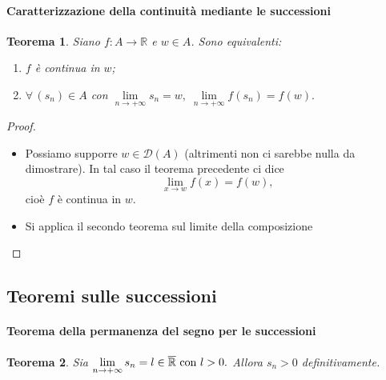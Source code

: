 \documentclass{article}
\theoremstyle{plain}
\newtheorem{thm}{Teorema}[section]
\theoremstyle{definition}
\theoremstyle{remark}
\begin{document}
\vspace{10pt}

\paragraph{Caratterizzazione della continuità mediante le successioni}
\begin{bxthm}
\begin{thm}
    Siano $f:A\to\mathbb{R}$ e $w\in A$. Sono equivalenti:
    \begin{enumerate}
        \item[$(a)$] $f$ è continua in $w$;
        \item[$(b)$] $\forall\,(s_n)\in A$ con $\lim\limits_{n\to+\infty}s_n=w,\;\lim\limits_{n\to+\infty}f(s_n)=f(w).$
    \end{enumerate}
\end{thm}
\end{bxthm}
\begin{proof}\hfill
    \begin{itemize}
        \item[$(b)\implies (a)$]
        Possiamo supporre $w\in \mathcal{D}(A)$ (altrimenti non ci sarebbe nulla da dimostrare).
        In tal caso il teorema precedente ci dice \[\lim_{x\to w}f(x)=f(w),\] cioè $f$ è continua in $w$.
        \item[$(a)\implies(b)$]
        Si applica il secondo teorema sul limite della composizione
    \end{itemize}
\end{proof}

\vspace{10pt}

\subsection{Teoremi sulle successioni}

\vspace{10pt}

\paragraph{Teorema della permanenza del segno per le successioni}
\begin{bxthm}
\begin{thm}
    Sia \(\lim\limits_{n\to+\infty}s_n=l\in \overline{\mathbb{R}}\textup{ con }l>0.\)
    Allora $s_n>0$ definitivamente.
\end{thm}
\end{bxthm}
\end{document}
